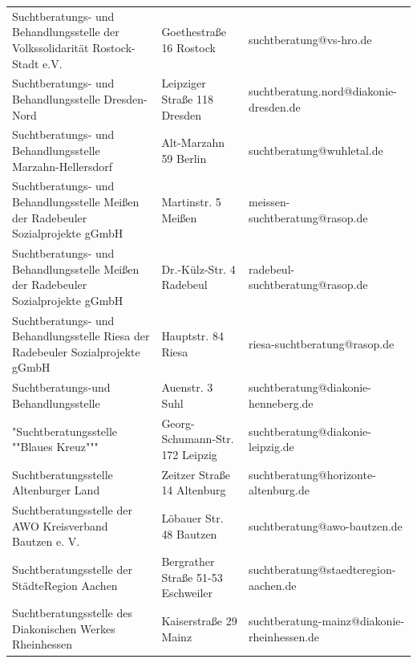 {\begin{xltabular}{\textwidth} {
 >{\raggedright\arraybackslash}p{5cm}
 >{\raggedright\arraybackslash}X
 >{\raggedright\arraybackslash}p{5cm} }
Suchtberatungs- und Behandlungsstelle der Volkssolidarität Rostock-Stadt e.V. & Goethestraße 16 Rostock & suchtberatung@vs-hro.de \\
Suchtberatungs- und Behandlungsstelle Dresden-Nord & Leipziger Straße 118 Dresden & suchtberatung.nord@diakonie-dresden.de \\
Suchtberatungs- und Behandlungsstelle Marzahn-Hellersdorf & Alt-Marzahn 59 Berlin & suchtberatung@wuhletal.de \\
Suchtberatungs- und Behandlungsstelle Meißen der Radebeuler Sozialprojekte gGmbH & Martinstr. 5 Meißen & meissen-suchtberatung@rasop.de \\
Suchtberatungs- und Behandlungsstelle Meißen der Radebeuler Sozialprojekte gGmbH & Dr.-Külz-Str. 4 Radebeul & radebeul-suchtberatung@rasop.de \\
Suchtberatungs- und Behandlungsstelle Riesa der Radebeuler Sozialprojekte gGmbH & Hauptstr. 84 Riesa & riesa-suchtberatung@rasop.de \\
Suchtberatungs-und Behandlungsstelle & Auenstr. 3 Suhl & suchtberatung@diakonie-henneberg.de \\
"Suchtberatungsstelle ""Blaues Kreuz""" & Georg-Schumann-Str. 172 Leipzig & suchtberatung@diakonie-leipzig.de \\
Suchtberatungsstelle Altenburger Land & Zeitzer Straße 14 Altenburg & suchtberatung@horizonte-altenburg.de \\
Suchtberatungsstelle der AWO Kreisverband Bautzen e. V. & Löbauer Str. 48 Bautzen & suchtberatung@awo-bautzen.de \\
Suchtberatungsstelle der StädteRegion Aachen & Bergrather Straße 51-53 Eschweiler & suchtberatung@staedteregion-aachen.de \\
Suchtberatungsstelle des Diakonischen Werkes Rheinhessen & Kaiserstraße 29 Mainz & suchtberatung-mainz@diakonie-rheinhessen.de \\

\end{xltabular}}

